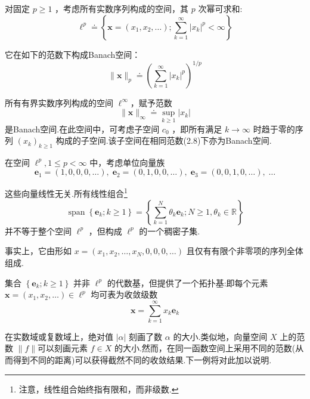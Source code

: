 \begin{instance}
    对固定 $p \geq  1$ ，考虑所有实数序列构成的空间，其 $p$ 次幂可求和:
\begin{equation}\tag{2.6}
{\ell }^{p} \doteq  \left\{  {\bm{x} = \left( {{x}_{1},{x}_{2},\ldots }\right) ;\mathop{\sum }\limits_{{k = 1}}^{\infty }{\left| {x}_{k}\right| }^{p} < \infty }\right\}
\end{equation}

它在如下的范数下构成Banach空间：
\begin{equation}\tag{2.7}
\| \bm{x}{\| }_{p} \doteq  {\left( \mathop{\sum }\limits_{{k = 1}}^{\infty }{\left| {x}_{k}\right| }^{p}\right) }^{1/p}
\end{equation}

\end{instance}
\begin{instance}
    所有有界实数序列构成的空间 ${\ell }^{\infty }$，赋予范数
\begin{equation}\tag{2.8}
\| \bm{x}{\| }_{\infty } \doteq  \mathop{\sup }\limits_{{k \geq  1}}\left| {x}_{k}\right|
\end{equation}
是Banach空间.在此空间中，可考虑子空间 ${c}_{0}$ ，即所有满足 $k \rightarrow  \infty$ 时趋于零的序列 ${\left( {x}_{k}\right) }_{k \geq  1}$ 构成的子空间.该子空间在相同范数(2.8)下亦为Banach空间.

\end{instance}

\begin{remark}
    在空间 ${\ell }^{p},1 \leq  p < \infty$ 中，考虑单位向量族
\begin{equation}\tag{2.9}
{\bm{e}}_{1} = \left( {1,0,0,0,\ldots }\right) ,\;{\bm{e}}_{2} = \left( {0,1,0,0,\ldots }\right) ,\;{\bm{e}}_{3} = \left( {0,0,1,0,\ldots }\right) ,\;\ldots
\end{equation}\par
\vspace{-0.1 em}
这些向量线性无关.所有线性组合\footnote{注意，线性组合始终指有限和，而非级数.}
\begin{equation}\tag{2.10}
\operatorname{span}\left\{  {{\bm{e}}_{k};k \geq  1}\right\}   = \left\{  {\mathop{\sum }\limits_{{k = 1}}^{N}{\theta }_{k}{\bm{e}}_{k};N \geq  1,{\theta }_{k} \in  \mathbb{R}}\right\}
\end{equation}
并不等于整个空间 ${\ell }^{p}$ ，但构成 ${\ell }^{p}$ 的一个稠密子集.\par
事实上，它由形如 $x = \left( {{x}_{1},{x}_{2},\ldots ,{x}_{N},0,0,0,\ldots }\right)$ 且仅有有限个非零项的序列全体组成.\par
集合 $\left\{  {{\bm{e}}_{k};k \geq  1}\right\}$ 并非 ${\ell }^{p}$ 的代数基，但提供了一个拓扑基:即每个元素 $\bm{x} = \left( {{x}_{1},{x}_{2},\ldots }\right)  \in  {\ell }^{p}$ 均可表为收敛级数
\[
\bm{x} = \mathop{\sum }\limits_{{k = 1}}^{\infty }{x}_{k}{\bm{e}}_{k}
\]
\end{remark}
\begin{remark}
    在实数域或复数域上，绝对值 $\left| \alpha \right|$ 刻画了数 $\alpha$ 的大小.类似地，向量空间 $X$ 上的范数 $\| f\|$可以刻画元素 $f \in  X$ 的大小.然而，在同一函数空间上采用不同的范数(从而得到不同的距离)可以获得截然不同的收敛结果.下一例将对此加以说明.
\end{remark}

